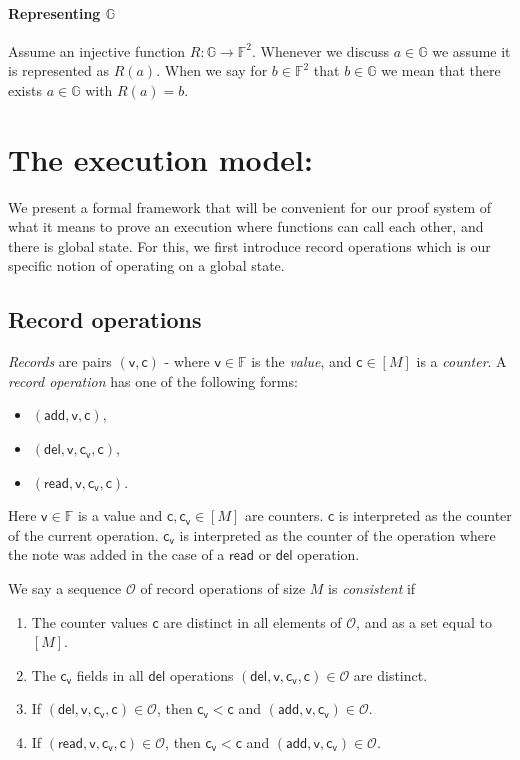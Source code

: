 \documentclass[11pt]{article} %
\newcommand{\G}{\ensuremath{{\mathbb G}}\xspace}
\newcommand{\F}{\ensuremath{\mathbb F}\xspace}
\renewcommand{\c}{\ensuremath{\mathsf{c}}\xspace}
\newcommand{\vc}{\ensuremath{\mathsf{c_v}}\xspace}
\renewcommand{\v}{\ensuremath{\mathsf{v}}\xspace}
\newcommand{\add}{\ensuremath{\mathsf{add}}\xspace}
\newcommand{\del}{\ensuremath{\mathsf{del}}\xspace}
\renewcommand{\read}{\ensuremath{\mathsf{read}}\xspace}
\newcommand{\countrange}{\ensuremath{[M]}\xspace}
\newcommand{\ops}{\ensuremath{\mathcal{O}}\xspace}
\begin{document}
\paragraph{Representing \G}
Assume an injective function $R:\G \to \F^2$.
Whenever we discuss $a\in \G$ we assume it is represented as  $R(a)$.
When we say for $b\in \F^2$ that $b\in \G$ we mean that there exists $a\in \G$ with $R(a)=b$.

\section{The execution model:}
We present a formal framework that will be convenient for our proof system of what it means to prove an execution where functions can call each other, and there is global state.
For this, we first introduce record operations which is our specific notion of operating on a global state. 
\subsection{Record operations}
\emph{Records} are pairs $(\v,\c)$ - where $\v\in \F$ is the \emph{value}, and $\c\in \countrange$ is a \emph{counter}.
A \emph{record operation} has one of the following forms:
\begin{itemize}
 \item $(\add,\v,\c)$,
\item $(\del,\v,\vc,\c)$,
\item $(\read,\v,\vc,\c)$.

\end{itemize}
Here $\v\in \F$ is a value and $\c,\vc \in \countrange$ are counters.
$\c$ is interpreted as the counter of the current operation. $\vc$
  is interpreted as the counter of the operation where
the note was added in the case of a \read or \del operation.



We say a sequence \ops of record operations of size $M$ is \emph{consistent} if
\begin{enumerate}
\item The counter values $\c$ are distinct in all elements of \ops, and as a set equal to \countrange.
\item The $\vc$ fields in all $\del$ operations $(\del,\v,\vc,\c)\in \ops$ are distinct.
\item If $(\del,\v,\vc,\c)\in \ops$, then $\vc<\c$ and $(\add,\v,\vc)\in \ops$.
\item If $(\read,\v,\vc,\c)\in \ops$, then $\vc<\c$ and $(\add,\v,\vc)\in \ops$.
\end{enumerate}
\end{document}
